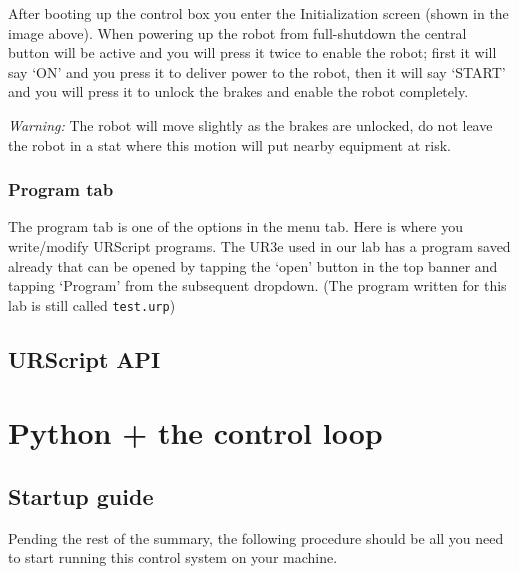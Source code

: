 \documentclass[11pt]{article}
\begin{document}
After booting up the control box you enter the Initialization screen (shown in the image above). When powering up the robot from full-shutdown the central button will be active and you will press it twice to enable the robot; first it will say `ON' and you press it to deliver power to the robot, then it will say `START' and you will press it to unlock the brakes and enable the robot completely.

\emph{Warning:} The robot will move slightly as the brakes are unlocked, do not leave the robot in a stat where this motion will put nearby equipment at risk.

\subsubsection*{Program tab}
The program tab is one of the options in the menu tab. Here is where you write/modify URScript programs. The UR3e used in our lab has a program saved already that can be opened by tapping the `open' button in the top banner and tapping `Program' from the subsequent dropdown. (The program written for this lab is still called \texttt{test.urp})

\subsection{URScript API}\label{sec:urscript}

\section{Python + the control loop}\label{sec:control_code}
\subsection{Startup guide}\label{sec:startup}
Pending the rest of the summary, the following procedure should be all you need to start running this control system on your machine.
\end{document}

